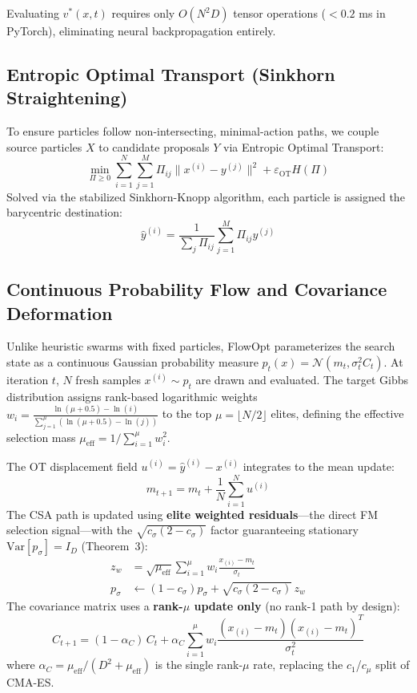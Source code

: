 \documentclass[10pt,journal,compsoc]{IEEEtran}
\begin{document}
Evaluating $v^*(x, t)$ requires only $O(N^2 D)$ tensor operations ($<0.2$ ms in PyTorch), eliminating neural backpropagation entirely.

\subsection{Entropic Optimal Transport (Sinkhorn Straightening)}
To ensure particles follow non-intersecting, minimal-action paths, we couple source particles $X$ to candidate proposals $Y$ via Entropic Optimal Transport:
\begin{equation}
\min_{\Pi \ge 0} \sum_{i=1}^N \sum_{j=1}^M \Pi_{ij} \|x^{(i)} - y^{(j)}\|^2 + \varepsilon_{\text{OT}} H(\Pi)
\end{equation}
Solved via the stabilized Sinkhorn-Knopp algorithm, each particle is assigned the barycentric destination:
\begin{equation}
\hat{y}^{(i)} = \frac{1}{\sum_j \Pi_{ij}} \sum_{j=1}^M \Pi_{ij} y^{(j)}
\end{equation}

\subsection{Continuous Probability Flow and Covariance Deformation}
Unlike heuristic swarms with fixed particles, FlowOpt parameterizes the search state as a continuous Gaussian probability measure $p_t(x) = \mathcal{N}(m_t, \sigma_t^2 C_t)$. At iteration $t$, $N$ fresh samples $x^{(i)} \sim p_t$ are drawn and evaluated. The target Gibbs distribution assigns rank-based logarithmic weights $w_i = \frac{\ln(\mu + 0.5) - \ln(i)}{\sum_{j=1}^\mu (\ln(\mu+0.5) - \ln(j))}$ to the top $\mu = \lfloor N/2 \rfloor$ elites, defining the effective selection mass $\mu_{\text{eff}} = 1 / \sum_{i=1}^\mu w_i^2$. 

The OT displacement field $u^{(i)} = \hat{y}^{(i)} - x^{(i)}$ integrates to the mean update:
\begin{equation}
m_{t+1} = m_t + \frac{1}{N}\sum_{i=1}^N u^{(i)}
\end{equation}
The CSA path is updated using \textbf{elite weighted residuals}---the direct FM selection signal---with the $\sqrt{c_\sigma(2-c_\sigma)}$ factor guaranteeing stationary $\text{Var}[p_\sigma]=I_D$ (Theorem~3):
\begin{align}
z_w &= \sqrt{\mu_{\text{eff}}} \sum_{i=1}^\mu w_i \frac{x_{(i)} - m_t}{\sigma_t} \\
p_\sigma &\leftarrow (1 - c_\sigma) p_\sigma + \sqrt{c_\sigma(2-c_\sigma)}\, z_w
\end{align}
The covariance matrix uses a \textbf{rank-$\mu$ update only} (no rank-1 path by design):
\begin{equation}
C_{t+1} = (1 - \alpha_C)\,C_t + \alpha_C \sum_{i=1}^{\mu} w_i \frac{(x_{(i)}-m_t)(x_{(i)}-m_t)^T}{\sigma_t^2}
\end{equation}
where $\alpha_C = \mu_\text{eff}/(D^2+\mu_\text{eff})$ is the single rank-$\mu$ rate, replacing the $c_1$/$c_\mu$ split of CMA-ES.
\end{document}
